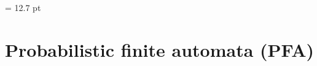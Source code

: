 \documentclass[a4paper,cleveref, autoref, thm-restate]{lipics-v2021}
\begin{document}
{ \smallskip
  \vfill 
  \noindent
  \hspace*{7mm}\colorbox[rgb]{1,1,1}{}%
\def\section*#1{}

 \def\addvspace#1{\vspace {0.03pt}}
 
                          

  

 
 \baselineskip = 12.7 pt
 \enlargethispage{1.2\baselineskip} %
  \tableofcontents
  \par
}



\newpage
\section{Probabilistic finite automata (PFA)}
\label{sec:PFA}
\end{document}
